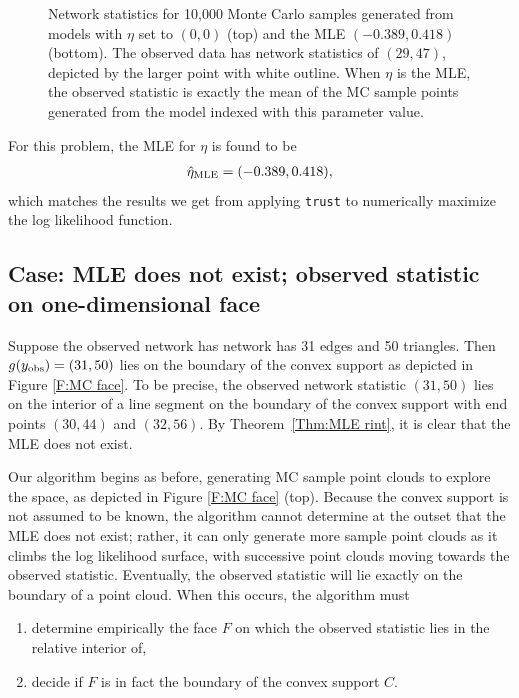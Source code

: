 \begin{figure}[!ht]
\caption[Network statistics for 10,000 Monte Carlo samples when MLE exists]
{Network statistics for 10,000 Monte Carlo samples generated from models 
with $\eta$ set to $(0,0)$ (top) and the MLE $(-0.389, 0.418)$ 
(bottom).  The observed data has network statistics of $(29,47)$, depicted by the 
larger point with white outline.  When $\eta$ is the MLE, the observed statistic is 
exactly the mean of the MC sample points generated from the model indexed with this parameter 
value. }
\label{F:MC cloud}
\end{figure}
For this problem, the MLE for $\eta$ is found to be
\begin{align*}
\hat{\eta}_{\textrm{MLE}} = (-0.389, 0.418),
\end{align*}
which matches the results we get from applying \texttt{trust} to numerically
maximize the log likelihood function.

\subsection{Case: MLE does not exist; observed statistic on one-dimensional face}
Suppose the observed network has network has 31 edges and 50 triangles.  Then 
$g(y_{\text{obs}}) = (31,50)$ lies on the boundary of the convex support as depicted in 
Figure \ref{F:MC face}.  To be precise, the observed network statistic $(31,50)$ lies 
on the interior of a line segment on the boundary of the convex support with 
end points $(30,44)$ and $(32,56)$. 
By Theorem~\ref{Thm:MLE rint}, it is clear that the MLE does not exist.

Our algorithm begins as before, generating MC sample point clouds to explore the 
space, as depicted in Figure \ref{F:MC face} (top).  Because the convex 
support is not assumed to be known, 
the algorithm cannot determine at the outset that the MLE does 
not exist; rather, it can only generate more sample point clouds as it climbs the log 
likelihood surface, with successive point clouds moving towards the observed statistic.
Eventually, the observed statistic will lie exactly on the boundary of a point cloud.
When this occurs, the algorithm must 
\begin{enumerate}
\item determine empirically the face $F$ on which the observed statistic lies in the 
relative interior of,
\item decide if $F$ is in fact the boundary of the convex support $C$.
\end{enumerate}  

